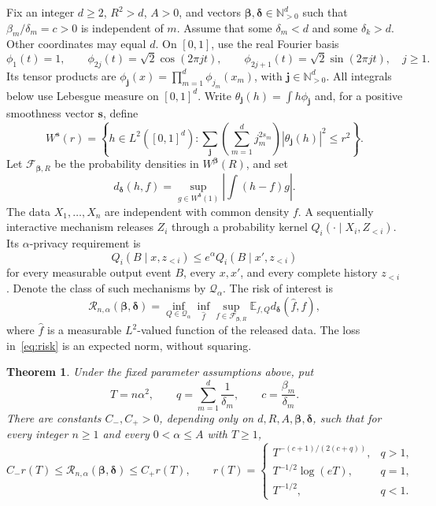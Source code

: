 \documentclass[11pt]{article}
\newtheorem{theorem}{Theorem}
\newcommand{\E}{\mathbb E}
\newcommand{\N}{\mathbb N}
\begin{document}
Fix an integer $d\ge2$, $R^2>d$, $A>0$, and vectors
$\boldsymbol\beta,\boldsymbol\delta\in\N_{>0}^d$ such that
$\beta_m/\delta_m=c>0$ is independent of $m$. Assume that some
$\delta_m<d$ and some $\delta_k>d$. Other coordinates may equal $d$.
On $[0,1]$, use the real Fourier basis
\[
 \phi_1(t)=1,\qquad
 \phi_{2j}(t)=\sqrt2\cos(2\pi jt),\qquad
 \phi_{2j+1}(t)=\sqrt2\sin(2\pi jt),\quad j\ge1.
\]
Its tensor products are $\phi_{\mathbf j}(x)=\prod_{m=1}^d\phi_{j_m}(x_m)$,
with $\mathbf j\in\N_{>0}^d$. All integrals below use Lebesgue measure on
$[0,1]^d$. Write $\theta_{\mathbf j}(h)=\int h\phi_{\mathbf j}$ and, for a
positive smoothness vector $\mathbf s$, define
\[
 W^{\mathbf s}(r)=\left\{h\in L^2([0,1]^d):
 \sum_{\mathbf j}\left(\sum_{m=1}^d j_m^{2s_m}\right)
 |\theta_{\mathbf j}(h)|^2\le r^2\right\}.
\]
Let $\mathcal F_{\boldsymbol\beta,R}$ be the probability densities in
$W^{\boldsymbol\beta}(R)$, and set
\[
 d_{\boldsymbol\delta}(h,f)=
 \sup_{g\in W^{\boldsymbol\delta}(1)}\left|\int(h-f)g\right|.
\]
The data $X_1,\ldots,X_n$ are independent with common density $f$.
A sequentially interactive mechanism releases $Z_i$ through a probability
kernel $Q_i(\cdot\mid X_i,Z_{<i})$. Its $\alpha$-privacy requirement is
\begin{equation}\label{eq:privacy}
 Q_i(B\mid x,z_{<i})\le e^\alpha Q_i(B\mid x',z_{<i})
\end{equation}
for every measurable output event $B$, every $x,x'$, and every complete
history $z_{<i}$. Denote the class of such mechanisms by $\mathcal Q_\alpha$.
The risk of interest is
\begin{equation}\label{eq:risk}
 \mathcal R_{n,\alpha}(\boldsymbol\beta,\boldsymbol\delta)
 =\inf_{Q\in\mathcal Q_\alpha}\inf_{\widehat f}
  \sup_{f\in\mathcal F_{\boldsymbol\beta,R}}
  \E_{f,Q}d_{\boldsymbol\delta}(\widehat f,f),
\end{equation}
where $\widehat f$ is a measurable $L^2$-valued function of the released
data. The loss in~\eqref{eq:risk} is an expected norm, without squaring.

\begin{theorem}\label{thm:main}
Under the fixed parameter assumptions above, put
\[
 T=n\alpha^2,\qquad q=\sum_{m=1}^d\frac1{\delta_m},\qquad
 c=\frac{\beta_m}{\delta_m}.
\]
There are constants $C_-,C_+>0$, depending only on
$d,R,A,\boldsymbol\beta,\boldsymbol\delta$, such that for every integer
$n\ge1$ and every $0<\alpha\le A$ with $T\ge1$,
\begin{equation}\label{eq:mainrate}
 C_-r(T)\le\mathcal R_{n,\alpha}(\boldsymbol\beta,\boldsymbol\delta)
 \le C_+r(T),\qquad
 r(T)=\begin{cases}
 T^{-(c+1)/(2(c+q))},&q>1,\\[2pt]
 T^{-1/2}\log(eT),&q=1,\\[2pt]
 T^{-1/2},&q<1.
 \end{cases}
\end{equation}
\end{theorem}
\end{document}
